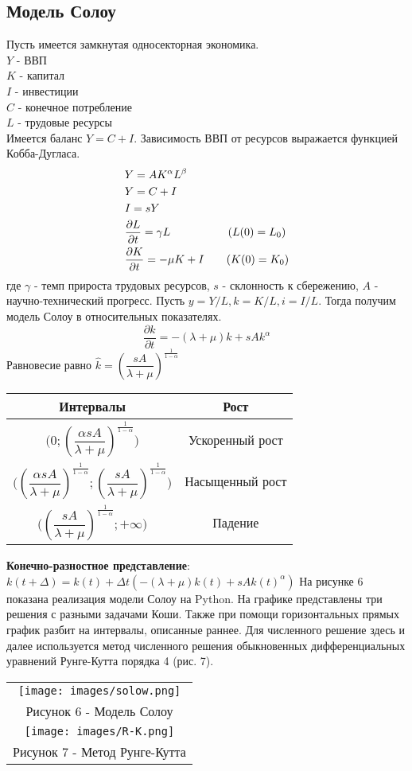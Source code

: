 \subsection{Модель Солоу}
Пусть имеется замкнутая односекторная экономика.\\
$Y$ - ВВП\\
$K$ - капитал\\
$I$ - инвестиции\\
$C$ - конечное потребление\\
$L$ - трудовые ресурсы\\
Имеется баланс $Y=C+I$. Зависимость ВВП от ресурсов выражается функцией Кобба-Дугласа.
\begin{align}
  &Y=AK^{\alpha}L^{\beta}\notag\\
  &Y=C+I\notag\\
  &I=sY\\
  &\dfrac{\partial L}{\partial t}=\gamma L \qquad \qquad\quad\,(L(0)=L_0)\notag\\
  &\dfrac{\partial K}{\partial t}=-\mu K+I \qquad(K(0)=K_0)\notag
\end{align}
где $ \gamma$ - темп прироста трудовых ресурсов, $s$ - склонность к сбережению, $A$ - научно-технический прогресс.
Пусть $y=Y/L,k=K/L,i=I/L$. Тогда получим модель Солоу в относительных показателях.
\begin{equation}
  \frac{\partial k}{\partial t}=-(\lambda+\mu)k+sAk^{\alpha}
\end{equation}
Равновесие равно $\hat{k}=(\dfrac{sA}{\lambda+\mu})^{\frac{1}{1-\alpha}}$
\begin{center}
\begin{tabular}{|c|c|}
  \hline
  Интервалы&Рост\\
  \hline
  $\bigg(0;(\dfrac{\alpha sA}{\lambda+\mu})^{\frac{1}{1-\alpha}}\bigg)$&Ускоренный рост\\
  \hline
  $\bigg((\dfrac{\alpha sA}{\lambda+\mu})^{\frac{1}{1-\alpha}};(\dfrac{sA}{\lambda+\mu})^{\frac{1}{1-\alpha}}\bigg)$&Насыщенный рост\\
  \hline
  $\bigg((\dfrac{sA}{\lambda+\mu})^{\frac{1}{1-\alpha}};+\infty\bigg)$&Падение\\
  \hline
\end{tabular}
\end{center}
\textbf{Конечно-разностное представление}:
$k(t+\Delta)=k(t)+\Delta t(-(\lambda+\mu)k(t)+sAk(t)^{\alpha})$
На рисунке 6 показана реализация модели Солоу на Python. На графике представлены три решения с разными задачами Коши. Также при помощи горизонтальных прямых график разбит на интервалы, описанные раннее.
Для численного решение здесь и далее используется метод численного решения обыкновенных дифференциальных уравнений Рунге-Кутта порядка 4 (рис. 7).
\begin{center}
  \begin{tabular}{c}
    \texttt{[image: images/solow.png]}\\
    Рисунок 6 - Модель Солоу\\
    \texttt{[image: images/R-K.png]}\\
    Рисунок 7 - Метод Рунге-Кутта
  \end{tabular}
\end{center}



